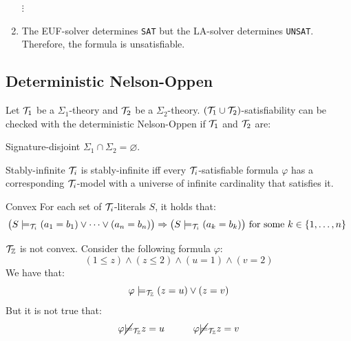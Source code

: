 \begin{example}
\begin{enumerate}
        \begin{center}
            $\vdots$
        \end{center}

        \item The EUF-solver determines \texttt{SAT} but the LA-solver determines \texttt{UNSAT}.
            Therefore, the formula is unsatisfiable.
    \end{enumerate}
\end{example}


\subsection{Deterministic Nelson-Oppen}

Let $\mathcal{T}_1$ be a $\Sigma_1$-theory and $\mathcal{T}_2$ be a $\Sigma_2$-theory. 
$(\mathcal{T}_1 \cup \mathcal{T}_2)$-satisfiability can be checked with the deterministic Nelson-Oppen if $\mathcal{T}_1$ and $\mathcal{T}_2$ are:
\begin{descriptionlist}
    \item[Signature-disjoint] $\Sigma_1 \cap \Sigma_2 = \varnothing$.
    \item[Stably-infinite] $\mathcal{T}_i$ is stably-infinite iff every $\mathcal{T}_i$-satisfiable formula $\varphi$ has a corresponding 
        $\mathcal{T}_i$-model with a universe of infinite cardinality that satisfies it.
    \item[Convex] For each set of $\mathcal{T}_i$-literals $S$, it holds that:
        \[ \big( S \models_{\mathcal{T}_i} (a_1 = b_1) \vee \dots \vee (a_n = b_n) \big) \Rightarrow \big( S \models_{\mathcal{T}_i} (a_k = b_k) \big) \text{ for some $k \in \{ 1, \dots, n \}$ } \]
        \begin{example}
            $\mathcal{T}_\mathbb{Z}$ is not convex. Consider the following formula $\varphi$:
            \[ (1 \leq z) \land (z \leq 2) \land (u = 1) \land (v = 2) \]
            We have that:
            \[ \varphi \models_{\mathcal{T}_\mathbb{Z}} (z = u) \vee (z = v) \]
            But it is not true that:
            \[ \varphi \cancel{\models}_{\mathcal{T}_\mathbb{Z}} z = u \hspace{3em} \varphi \cancel{\models}_{\mathcal{T}_\mathbb{Z}} z = v \]
        \end{example}
\end{descriptionlist}

